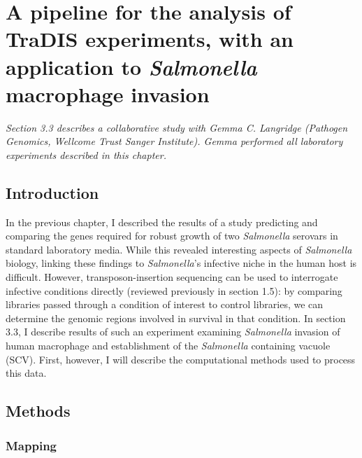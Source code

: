 
\chapter{A pipeline for the analysis of TraDIS experiments, with an application to {\it Salmonella} macrophage invasion}
\label{sec:chapterPingpong}
\ifpdf
    \graphicspath{{Chapter3/Chapter3Figs/EPS/}{Chapter3/Chapter3Figs/}}
\fi

\textit{Section 3.3 describes a collaborative study with Gemma C. Langridge (Pathogen Genomics, Wellcome Trust Sanger Institute). Gemma performed all laboratory experiments described in this chapter.}

\section{Introduction}

In the previous chapter, I described the results of a study predicting and comparing the genes required for robust growth of two \textit{Salmonella} serovars in standard laboratory media. While this revealed interesting aspects of \textit{Salmonella} biology, linking these findings to \textit{Salmonella}'s infective niche in the human host is difficult. However, transposon-insertion sequencing can be used to interrogate infective conditions directly (reviewed previously in section 1.5): by comparing libraries passed through a condition of interest to control libraries, we can determine the genomic regions involved in survival in that condition. In section 3.3, I describe results of such an experiment examining \textit{Salmonella} invasion of human macrophage and establishment of the \textit{Salmonella} containing vacuole (SCV). First, however, I will describe the computational methods used to process this data.

\section{Methods}

\subsection{Mapping}


